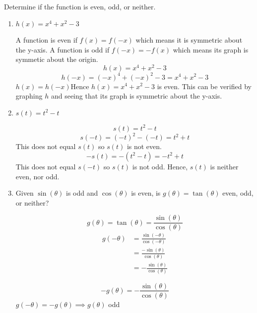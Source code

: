 \documentclass[nooutcomes, noinstructornotes]{ximera}
\begin{document}
\begin{problem}
Determine if the function is even, odd, or neither.


\begin{enumerate}	
	\item  $h(x)=x^4+x^2-3$
		\begin{freeResponse}

		A function is even if $f(x)=f(-x)$ which means it is symmetric about the y-axis.  A function is odd if $f(-x)=-f(x)$ which means its graph is symmetic about the origin. 
		 $$h(x)=x^4+x^2-3$$
			$$h(-x)=(-x)^4+(-x)^2-3=x^4+x^2-3$$
			$h(x)=h(-x)$Hence $h(x)=x^4+x^2-3$ is even.  This can be verified by graphing $h$ and seeing that its graph is symmetric about the y-axis.
		\end{freeResponse}

	\item  $s(t)=t^2-t$
		\begin{freeResponse}
			$$s(t)=t^2-t$$
			$$s(-t)=(-t)^2-(-t)=t^2+t$$ This does not equal $s(t)$ so $s(t)$ is not even.
			$$-s(t)=-(t^2-t)=-t^2+t$$  This does not equal $s(-t)$ so $s(t)$ is not odd.  Hence, $s(t)$ is neither even, nor odd.
		\end{freeResponse}

	\item  Given $\sin(\theta)$ is odd and $\cos(\theta)$ is even, is $g(\theta)=\tan(\theta)$ even, odd, or neither?
		\begin{freeResponse}
		 $$g(\theta)=\tan(\theta)=\frac{\sin(\theta)}{\cos(\theta)}$$
			\begin{align*}
			g(-\theta)&=\frac{\sin(-\theta)}{\cos(-\theta)}\\
			&=\frac{-\sin(\theta)}{\cos(\theta)}\\
			&=-\frac{\sin(\theta)}{\cos(\theta)}
			\end{align*}
			\begin{center}
			$$-g(\theta)=-\frac{\sin(\theta)}{\cos(\theta)}$$
			$g(-\theta)=-g(\theta) \implies g(\theta)$ odd
			\end{center}
		\end{freeResponse}
	\end{enumerate}
	

	
\end{problem}

\begin{instructorNotes}

\end{instructorNotes}
\end{document}
